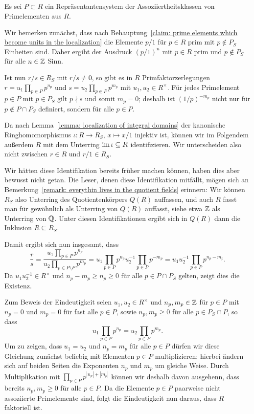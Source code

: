 \documentclass[a4paper,10pt,numbers=noenddot]{scrartcl}
\begin{document}
\subsection{}
Es sei $P \subset R$ ein Repräsentantensystem der Assoziiertheitsklassen von Primelementen aus $R$.

Wir bemerken zunächst, dass nach Behauptung~\ref{claim: prime elements which become units in the localization} die Elemente $p/1$ für $p \in R$ prim mit $p \notin P_S$ Einheiten sind.
Daher ergibt der Ausdruck $(p/1)^n$ mit $p \in R$ prim und $p \notin P_S$ für alle $n \in \mathbb{Z}$ Sinn.

Ist nun $r/s \in R_S$ mit $r/s \neq 0$, so gibt es in $R$ Primfaktorzerlegungen $r = u_1 \prod_{p \in P} p^{n_p}$ und $s = u_2 \prod_{p \in P} p^{m_p}$ mit $u_1, u_2 \in R^\times$.
Für jedes Primelement $p \in P$ mit $p \in P_S$ gilt $p \nmid s$ und somit $m_p = 0$;
deshalb ist $(1/p)^{-m_p}$ nicht nur für $p \notin P \cap P_S$ definiert, sondern für alle $p \in P$.

Da nach Lemma~\ref{lemma: localization of integral domains} der kanonische Ringhomomorphismus $\iota \colon R \to R_S$, $x \mapsto x/1$ injektiv ist, können wir im Folgendem außerdem $R$ mit dem Unterring $\operatorname{im} \iota \subseteq R$ identifizieren.
Wir unterscheiden also nicht zwischen $r \in R$ und $r/1 \in R_S$.

\begin{remark}
  Wir hätten diese Identifikation bereits früher machen können, haben dies aber bewusst nicht getan.
  Die Leser, denen diese Identifikation mitfällt, mögen sich an Bemerkung~\ref{remark: everythin lives in the quotient fields} erinnern:
  Wir können $R_S$ also Unterring des Quotientenkörpers $Q(R)$ auffassen, und auch $R$ fasst man für gewöhnlich als Unterring von $Q(R)$ auffasst, siehe etwa $\mathbb{Z}$ als Unterring von $\mathbb{Q}$.
  Unter diesen Identifikationen ergibt sich in $Q(R)$ dann die Inklusion $R \subseteq R_S$.
\end{remark}

Damit ergibt sich nun insgesamt, dass
\[
    \frac{r}{s}
  = \frac{u_1 \prod_{p \in P} p^{n_p}}{u_2 \prod_{p \in P \setminus P} p^{m_p}}
  = u_1 \prod_{p \in P} p^{n_p} u_2^{-1} \prod_{p \in P} p^{-m_p}
  = u_1 u_2^{-1} \prod_{p \in P} p^{n_p - m_p}.
\]
Da $u_1 u_2^{-1} \in R^\times$ und $n_p - m_p \geq n_p \geq 0$ für alle $p \in P \cap P_S$ gelten, zeigt dies die Existenz.

Zum Beweis der Eindeutigkeit seien $u_1, u_2 \in R^\times$ und $n_p, m_p \in \mathbb{Z}$ für $p \in P$ mit $n_p = 0$ und $m_p = 0$ für fast alle $p \in P$, sowie $n_p, m_p \geq 0$ für alle $p \in P_S \cap P$, so dass
\[
    u_1 \prod_{p \in P} p^{n_p}
  = u_2 \prod_{p \in P} p^{m_p}.
\]
Um zu zeigen, dass $u_1 = u_2$ und $n_p = m_p$ für alle $p \in P$ dürfen wir diese Gleichung zunächst beliebig mit Elementen $p \in P$ multiplizieren; hierbei ändern sich auf beiden Seiten die Exponenten $n_p$ und $m_p$ um gleiche Weise.
Durch Multiplikation mit $\prod_{p \in P} p^{|n_p| + |m_p|}$ können wir deshalb davon ausgehenn, dass bereits $n_p, m_p \geq 0$ für alle $p \in P$.
Da die Elemente $p \in P$ paarweise nicht assoziierte Primelemente sind, folgt die Eindeutigkeit nun daraus, dass $R$ faktoriell ist.
\end{document}

